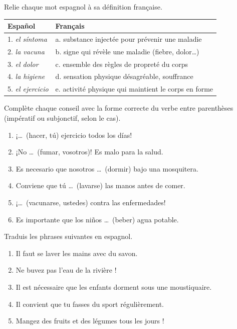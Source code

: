 \documentclass[11pt]{article}
\newcounter{popsec}
\newcounter{popsub}
\newcommand{\courssub}[1]{%
  \stepcounter{popsub}%
  \par\vspace{9pt}\noindent{\popxbold\fontsize{11.5}{13}\selectfont\color{popink}{\color{poporange}\thepopsec.\thepopsub}\hspace{6pt}#1}\par\nopagebreak\vspace{4pt}
}
\newcommand{\esp}[1]{\ifmmode\text{\textit{#1}}\else\begingroup\selectlanguage{spanish}\itshape #1\endgroup\fi}
\begin{document}
\begin{exercice}
Relie chaque mot espagnol à sa définition française.

\begin{center}
\begin{tabularx}{\linewidth}{|X|X|}
\hline
\rowcolor{popblueL} \textbf{Español} & \textbf{Français} \\
\hline
1. \esp{el síntoma} & a. substance injectée pour prévenir une maladie \\
\hline
2. \esp{la vacuna} & b. signe qui révèle une maladie (fiebre, dolor\ldots) \\
\hline
3. \esp{el dolor} & c. ensemble des règles de propreté du corps \\
\hline
4. \esp{la higiene} & d. sensation physique désagréable, souffrance \\
\hline
5. \esp{el ejercicio} & e. activité physique qui maintient le corps en forme \\
\hline
\end{tabularx}
\end{center}
\end{exercice}

\begin{exercice}
Complète chaque conseil avec la forme correcte du verbe entre parenthèses (impératif ou subjonctif, selon le cas).

\begin{enumerate}
\item ¡\ldots\ (hacer, tú) ejercicio todos los días!
\item ¡No \ldots\ (fumar, vosotros)! Es malo para la salud.
\item Es necesario que nosotros \ldots\ (dormir) bajo una mosquitera.
\item Conviene que tú \ldots\ (lavarse) las manos antes de comer.
\item ¡\ldots\ (vacunarse, ustedes) contra las enfermedades!
\item Es importante que los niños \ldots\ (beber) agua potable.
\end{enumerate}
\end{exercice}

\courssub{Je m'entraîne}

\begin{exercice}
Traduis les phrases suivantes en espagnol.

\begin{enumerate}
\item Il faut se laver les mains avec du savon.
\item Ne buvez pas l'eau de la rivière !
\item Il est nécessaire que les enfants dorment sous une moustiquaire.
\item Il convient que tu fasses du sport régulièrement.
\item Mangez des fruits et des légumes tous les jours !
\end{enumerate}
\end{exercice}
\end{document}
